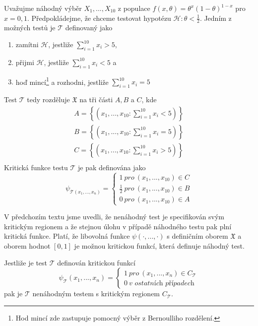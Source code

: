 \begin{example}
Uvažujme náhodný výběr $X_1, ..., X_{10}$ z populace $f(x, \theta) = \theta^x(1 - \theta)^{1 - x}$ pro $x = 0, 1$. Předpokládejme, že chceme testovat hypotézu $\mathscr{H}: \theta < \frac{1}{2}$. Jedním z možných testů je $\mathscr{T}$ definovaný jako
\begin{enumerate}
\item zamítni $\mathscr{H}$, jestliže $\sum_{i = 1}^{10} x_i > 5$,
\item přijmi $\mathscr{H}$, jestliže $\sum_{i = 1}^{10} x_i < 5$ a
\item hoď mincí\footnote{Hod mincí zde zastupuje pomocný výběr z Bernoulliho rozdělení.} a rozhodni, jestliže $\sum_{i = 1}^{10} x_i = 5$
\end{enumerate}
Test $\mathscr{T}$ tedy rozděluje $\mathfrak{X}$ na tři části $A, B$ a $C$, kde
\begin{gather*}
A = \left\{(x_1, ..., x_{10}: \sum_{i = 1}^{10}x_i < 5)\right\}\\
B = \left\{(x_1, ..., x_{10}: \sum_{i = 1}^{10}x_i = 5)\right\}\\
C = \left\{(x_1, ..., x_{10}: \sum_{i = 1}^{10}x_i > 5)\right\}\\
\end{gather*}
Kritická funkce testu $\mathscr{T}$ je pak definována jako
\begin{equation*}
\psi_{\mathscr{T}(x_1, ..., x_n)} =
\begin{cases}
1 ~ \textit{pro} ~ (x_1, ..., x_{10}) \in C\\
\frac{1}{2} ~ \textit{pro} ~ (x_1, ..., x_{10}) \in B\\
0 ~ \textit{pro} ~ (x_1, ..., x_{10}) \in A
\end{cases}
\end{equation*}
\end{example}

V předchozím textu jsme uvedli, že nenáhodný test je specifikován svým kritickým regionem a že stejnou úlohu v případě náhodného testu pak plní kritická funkce. Platí, že libovolná funkce $\psi(\cdot, ..., \cdot)$ s definičním oborem $\mathfrak{X}$ a oborem hodnot $[0, 1]$ je možnou kritickou funkcí, která definuje náhodný test.

Jestliže je test $\mathscr{T}$ definován kritickou funkcí
\begin{equation*}
\psi_{\mathscr{T}}(x_1, ..., x_n) =
\begin{cases}
1 ~ \textit{pro} ~ (x_1, ..., x_n) \in C_{\mathscr{T}}\\
0 ~ \textit{v ostatních případech}
\end{cases}
\end{equation*}
pak je $\mathscr{T}$ nenáhodným testem s kritickým regionem $C_{\mathscr{T}}$.


